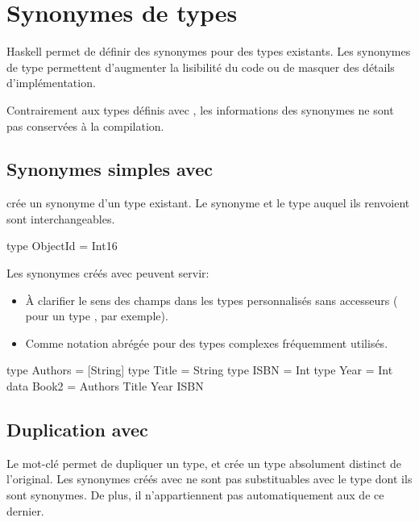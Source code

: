 \section{Synonymes de types}
\label{type-synonyms}

Haskell permet de définir des synonymes pour des types existants. Les synonymes de type permettent d'augmenter la lisibilité du code ou de masquer des détails d'implémentation.

Contrairement aux types définis avec , les informations des synonymes ne sont pas conservées à la compilation.

\subsection{Synonymes simples avec }

 crée un synonyme d'un type existant. Le synonyme et le type auquel ils renvoient sont interchangeables.

\begin{haskellcode}
type ObjectId = Int16
\end{haskellcode}

Les synonymes créés avec  peuvent servir:

\begin{itemize}
    \item À clarifier le sens des champs dans les types personnalisés sans accesseurs ( pour un type , par exemple).
    \item Comme notation abrégée pour des types complexes fréquemment utilisés.
\end{itemize}

\begin{infobox}

\end{infobox}

\begin{haskellcode}
type Authors = [String]
type Title = String
type ISBN = Int
type Year = Int
data Book2 = Authors Title Year ISBN
\end{haskellcode}

\subsection{Duplication avec }

Le mot-clé  permet de dupliquer un type, et crée un type absolument distinct de l'original. Les synonymes créés avec  ne sont pas substituables avec le type dont ils sont synonymes. De plus, il n'appartiennent pas automatiquement aux  de ce dernier.

